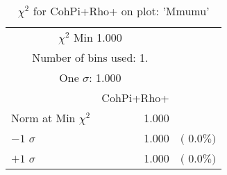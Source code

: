  \begin{table}[h!]\centering
 {\small{
 \begin{tabular}{||l||r||r||}
 \hline
 \hline
\multicolumn{2}{||c||}{$\chi^{2}$ Min   1.000} & \\
 \multicolumn{2}{||c||}{Number of bins used:   1.} & \\
\multicolumn{2}{||c||}{One $\sigma$:    1.000} & \\
 \hline
 \hline
    & CohPi+Rho+ & \\
Norm at Min $\chi^{2}$  &   1.000 & \\
$-1$ $\sigma$ &   1.000  &  $($  0.0$\%)$  \\
$+1$ $\sigma$ &   1.000  &  $($  0.0$\%)$  \\
 \hline
 \hline
 \end{tabular}
 \caption{$\chi^{2}$ for CohPi+Rho+ on plot: 'Mmumu'}
 \label{tab-chicohpip}
 }}
 \end{table}
 \endinput
